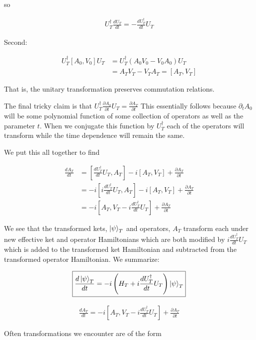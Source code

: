 \documentclass[12pt]{article}
\newcommand{\ddt}[1]{\frac{d #1}{dt}}
\begin{document}
so

\begin{align}
U_T^{\dag} \ddt{U_T} = - \ddt{U_T^{\dag}} U_T
\end{align}

Second:

\begin{align}
U_T^{\dag}[A_0,V_0]U_T &= U_T^{\dag}(A_0V_0 - V_0A_0)U_T\\
&= A_TV_T - V_TA_T = [A_T,V_T]
\end{align}

That is, the unitary transformation preserves commutation relations.

The final tricky claim is that $U_T^{\dag} \frac{\partial A_0}{\partial t} U_T = \frac{\partial A_T}{\partial t}$ This essentially follows because $\partial_t A_0$ will be some polynomial function of some collection of operators as well as the parameter $t$. When we conjugate this function by $U_T^{\dag}$ each of the operators will transform while the time dependence will remain the same.

We put this all together to find

\begin{align}
\ddt{A_T} &= \left[\ddt{U_T^{\dag}}U_T,A_T \right] -i [A_T,V_T] + \frac{\partial A_T}{\partial t}\\
&= -i  \left[i\ddt{U_T^{\dag}}U_T,A_T \right] -i [A_T,V_T] + \frac{\partial A_T}{\partial t}\\
&= -i \left[A_T, V_T - i \ddt{U_T^{\dag}}U_T\right] + \frac{\partial A_T}{\partial t}
\end{align}

We see that the transformed kets, $\ket{\psi}_T$ and operators, $A_T$ transform each under new effective ket and operator Hamiltonians which are both modified by $i\ddt{U_T^{\dag}}U_T$ which is added to the transformed ket Hamiltonian and subtracted from the transformed operator Hamiltonian. We summarize:

\begin{align}
\boxed{\ddt{\ket{\psi}_T} = -i \left(H_T + i\ddt{U_T^{\dag}}U_T \right) \ket{\psi}_T}
\end{align}

\begin{align}
\boxed{
	\ddt{A_T} = -i\left[A_T, V_T -i\ddt{U_T^{\dag}}U_T \right] + \frac{\partial A_T}{\partial t}
}
\end{align}

Often transformations we encounter are of the form
\end{document}

